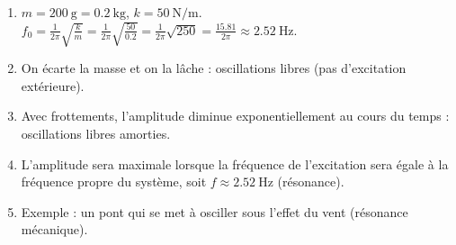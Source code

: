 \begin{enumerate}
\item $m = \SI{200}{\gram} = \SI{0.2}{\kilogram}$, $k = \SI{50}{\newton\per\metre}$.
$f_0 = \frac{1}{2\pi}\sqrt{\frac{k}{m}} = \frac{1}{2\pi}\sqrt{\frac{50}{0.2}} = \frac{1}{2\pi}\sqrt{250} = \frac{15.81}{2\pi} \approx \SI{2.52}{\hertz}$.
\item On écarte la masse et on la lâche : oscillations libres (pas d'excitation extérieure).
\item Avec frottements, l'amplitude diminue exponentiellement au cours du temps : oscillations libres amorties.
\item L'amplitude sera maximale lorsque la fréquence de l'excitation sera égale à la fréquence propre du système, soit $f \approx \SI{2.52}{\hertz}$ (résonance).
\item Exemple : un pont qui se met à osciller sous l'effet du vent (résonance mécanique).
\end{enumerate}